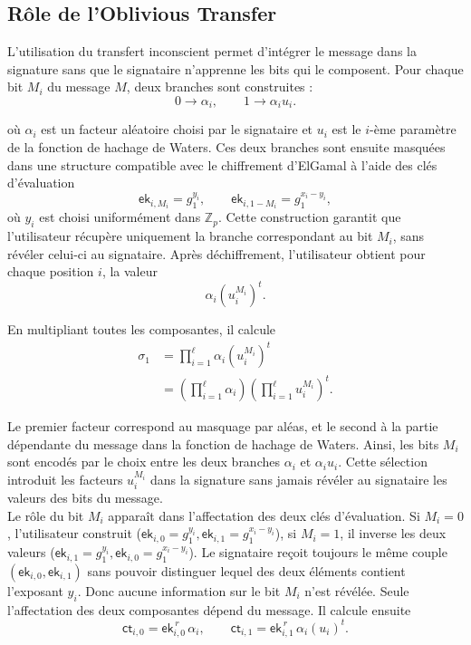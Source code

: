 

\subsection*{Rôle de l'Oblivious Transfer}

L'utilisation du transfert inconscient permet d'intégrer le message dans la signature sans que le signataire n'apprenne les bits qui le composent.
Pour chaque bit $M_i$ du message $M$, deux branches sont construites :
\[
0 \longrightarrow \alpha_i,
\qquad
1 \longrightarrow \alpha_i u_i.
\]

où $\alpha_i$ est un facteur aléatoire choisi par le signataire et $u_i$ est le $i$-ème paramètre de la fonction de hachage de Waters.
Ces deux branches sont ensuite masquées dans une structure compatible avec le chiffrement d'ElGamal à l'aide des clés d'évaluation
\[
\mathsf{ek}_{i,M_i}=g_1^{y_i},
\qquad
\mathsf{ek}_{i,1-M_i}=g_1^{x_i-y_i},
\]
où $y_i$ est choisi uniformément dans $\mathbb{Z}_p$. Cette construction garantit que l'utilisateur récupère uniquement la branche correspondant au bit $M_i$, sans révéler celui-ci au signataire.
Après déchiffrement, l'utilisateur obtient pour chaque position $i$, la valeur
\[
\alpha_i (u_i^{M_i})^t.
\]

En multipliant toutes les composantes, il calcule
\[
\begin{aligned}
\sigma_1
&=
\prod_{i=1}^{\ell}\alpha_i (u_i^{M_i})^t \\
&=
\left(\prod_{i=1}^{\ell}\alpha_i\right)
\left(\prod_{i=1}^{\ell}u_i^{M_i}\right)^t.
\end{aligned}
\]

Le premier facteur correspond au masquage par aléas, et le second à la partie dépendante du message dans la fonction de hachage de Waters.
Ainsi, les bits $M_i$ sont encodés par le choix entre les deux branches $\alpha_i$ et $\alpha_i u_i$. Cette sélection introduit les facteurs $u_i^{M_i}$ dans la signature sans jamais révéler au signataire les valeurs des bits du message.\\

Le rôle du bit $M_i$ apparaît dans l'affectation des deux clés d'évaluation. Si $M_i=0$, l'utilisateur construit
($
\mathsf{ek}_{i,0}=g_1^{y_i},
\mathsf{ek}_{i,1}=g_1^{x_i-y_i}
$),
si $M_i=1$, il inverse les deux valeurs
($
\mathsf{ek}_{i,1}=g_1^{y_i},
\mathsf{ek}_{i,0}=g_1^{x_i-y_i}
$).
Le signataire reçoit toujours le même couple $(\mathsf{ek}_{i,0},\mathsf{ek}_{i,1})$
sans pouvoir distinguer lequel des deux éléments contient l'exposant $y_i$. Donc aucune information sur le bit $M_i$ n'est révélée. Seule l'affectation des deux composantes dépend du message.
Il calcule ensuite
\[
\mathsf{ct}_{i,0}=\mathsf{ek}_{i,0}^{\,r}\,\alpha_i,
\qquad
\mathsf{ct}_{i,1}=\mathsf{ek}_{i,1}^{\,r}\,\alpha_i (u_i)^t.
\]

